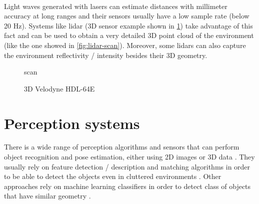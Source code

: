 \paragraph{}

Light waves generated with lasers can estimate distances with millimeter accuracy at long ranges and their sensors usually have a low sample rate (below 20 Hz). Systems like \gls{lidar} (3D sensor example shown in \cref{fig:velodyne-hdl-64e}) take advantage of this fact and can be used to obtain a very detailed 3D point cloud of the environment (like the one showed in \cref{fig:lidar-scan}). Moreover, some \glspl{lidar} can also capture the environment reflectivity / intensity besides their 3D geometry.

\begin{figure}[H]
	\begin{floatrow}[2]
		{\caption[ scan]{ scan\protect\footnotemark}\label{fig:lidar-scan}}
		{\caption[3D Velodyne HDL-64E]{3D Velodyne HDL-64E\protect\footnotemark}\label{fig:velodyne-hdl-64e}}
	\end{floatrow}
\end{figure}


\section{Perception systems}

There is a wide range of perception algorithms and sensors that can perform object recognition and pose estimation, either using 2D images \cite{Marton2011,Gauglitz2011,Costa2016ICARSC} or 3D data \cite{Wohlkinger2012,Aldoma2011}. They usually rely on feature detection / description and matching algorithms in order to be able to detect the objects even in cluttered environments \cite{Aldoma2016}. Other approaches rely on machine learning classifiers in order to detect class of objects that have similar geometry \cite{Costa2014,Rocha2015}.

